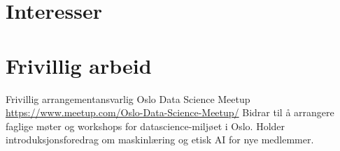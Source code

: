 \documentclass[a4paper, serif, 10pt]{moderncv}
\begin{document}
\section{Interesser}

\section{Frivillig arbeid}

        {Frivillig arrangementansvarlig}
        {Oslo Data Science Meetup}
        {\url{https://www.meetup.com/Oslo-Data-Science-Meetup/}}
        {}
        {Bidrar til å arrangere faglige møter og workshops for datascience-miljøet i Oslo.
Holder introduksjonsforedrag om maskinlæring og etisk AI for nye medlemmer.}
\end{document}
